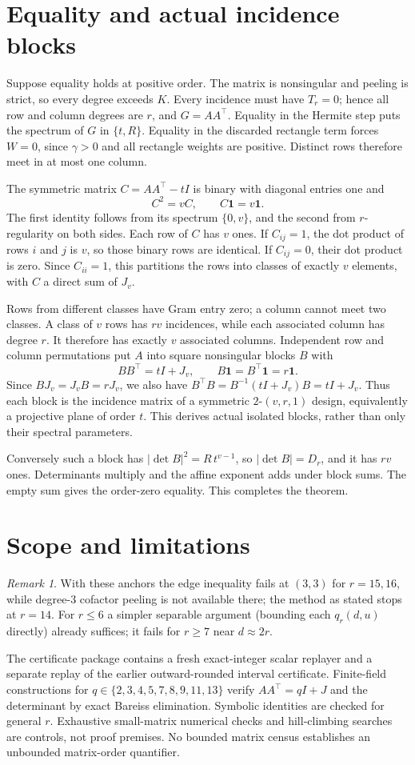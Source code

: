\documentclass[11pt]{article}
\theoremstyle{remark}
\newtheorem{remark}[theorem]{Remark}
\begin{document}
\section{Equality and actual incidence blocks}
Suppose equality holds at positive order. The matrix is nonsingular and
peeling is strict, so every degree exceeds $K$. Every incidence must have
$T_r=0$; hence all row and column degrees are $r$, and $G=AA^\top$.
Equality in the Hermite step puts the spectrum of $G$ in $\{t,R\}$.
Equality in the discarded rectangle term forces $W=0$, since $\gamma>0$ and
all rectangle weights are positive. Distinct rows therefore meet in at most
one column.

The symmetric matrix $C=AA^\top-tI$ is binary with diagonal entries one and
\[
 C^2=vC,\qquad C\mathbf1=v\mathbf1.
\]
The first identity follows from its spectrum $\{0,v\}$, and the second from
$r$-regularity on both sides. Each row of $C$ has $v$ ones. If $C_{ij}=1$,
the dot product of rows $i$ and $j$ is $v$, so those binary rows are identical.
If $C_{ij}=0$, their dot product is zero. Since $C_{ii}=1$, this partitions the
rows into classes of exactly $v$ elements, with $C$ a direct sum of $J_v$.

Rows from different classes have Gram entry zero; a column cannot meet two
classes. A class of $v$ rows has $rv$ incidences, while each associated column
has degree $r$. It therefore has exactly $v$ associated columns. Independent
row and column permutations put $A$ into square nonsingular blocks $B$ with
\[
 BB^\top=tI+J_v,\qquad B\mathbf1=B^\top\mathbf1=r\mathbf1.
\]
Since $BJ_v=J_vB=rJ_v$, we also have
$B^\top B=B^{-1}(tI+J_v)B=tI+J_v$. Thus each block is the incidence matrix
of a symmetric $2$-$(v,r,1)$ design, equivalently a projective plane of order
$t$. This derives actual isolated blocks, rather than only their spectral
parameters.

Conversely such a block has
$|\det B|^2=R\,t^{v-1}$, so $|\det B|=D_r$, and it has $rv$ ones.
Determinants multiply and the affine exponent adds under block sums.
The empty sum gives the order-zero equality. This completes the theorem.

\section{Scope and limitations}
\begin{remark}
With these anchors the edge inequality fails at $(3,3)$ for $r=15,16$, while degree-$3$ cofactor peeling is not
available there; the method as stated stops at $r=14$. For $r\le6$ a simpler separable argument (bounding each
$q_r(d,u)$ directly) already suffices; it fails for $r\ge7$ near $d\approx2r$.
\end{remark}
The certificate package contains a fresh exact-integer scalar replayer and a
separate replay of the earlier outward-rounded interval certificate.
Finite-field constructions for $q\in\{2,3,4,5,7,8,9,11,13\}$ verify
$AA^\top=qI+J$ and the determinant by exact Bareiss elimination. Symbolic
identities are checked for general $r$. Exhaustive small-matrix numerical
checks and hill-climbing searches are controls, not proof premises.
No bounded matrix census establishes an unbounded matrix-order quantifier.
\end{document}
